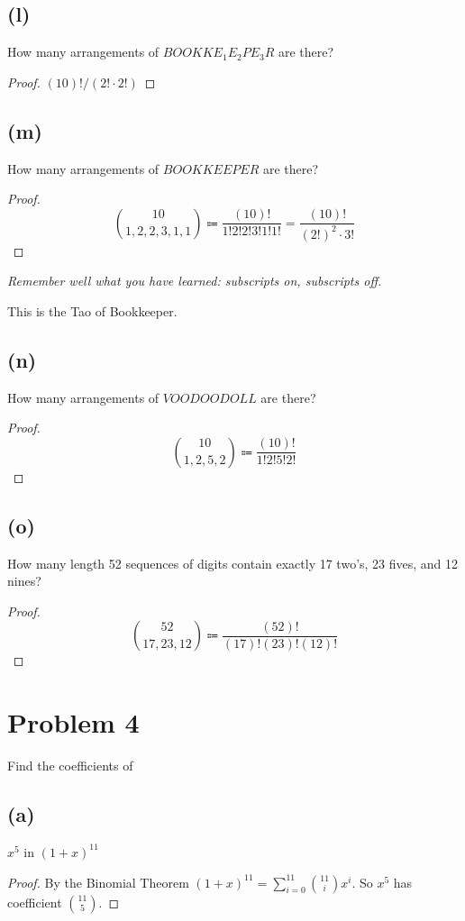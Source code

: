 \documentclass[14pt]{extarticle}
\newcommand{\dps}{\displaystyle}
\begin{document}
\subsection{(l)}
How many arrangements of $BOOKKE_1 E_2 PE_3 R$ are there?
\begin{proof}
$(10)! / (2! \cdot 2!)$
\end{proof}

\subsection{(m)}
How many arrangements of $BOOKKEEPER$ are there?
\begin{proof}
$$
\binom{10}{1,2,2,3,1,1} \Coloneqq \frac{(10)!}{1!2!2!3!1!1!} = \frac{(10)!}{(2!)^2 \cdot 3!}
$$
\end{proof}

\begin{center}
{\it Remember well what you have learned: subscripts on, subscripts off.

This is the Tao of Bookkeeper.}
\end{center}

\subsection{(n)}
How many arrangements of $VOODOODOLL$ are there?
\begin{proof}
$$
\binom{10}{1,2,5,2} \Coloneqq \frac{(10)!}{1!2!5!2!}
$$
\end{proof}

\subsection{(o)}
How many length 52 sequences of digits contain exactly 17 two’s, 23 fives, and 12 nines?
\begin{proof}
$$
\binom{52}{17,23,12} \Coloneqq \frac{(52)!}{(17)!(23)!(12)!}
$$
\end{proof}

\section{Problem 4}
Find the coefficients of

\subsection{(a)}
$x^5$ in $(1 + x)^{11}$
\begin{proof}
By the Binomial Theorem $\dps (1 + x)^{11} = \sum_{i = 0}^{11} \binom{11}{i}x^i$. So $x^5$ has coefficient $\binom{11}{5}$.
\end{proof}
\end{document}
